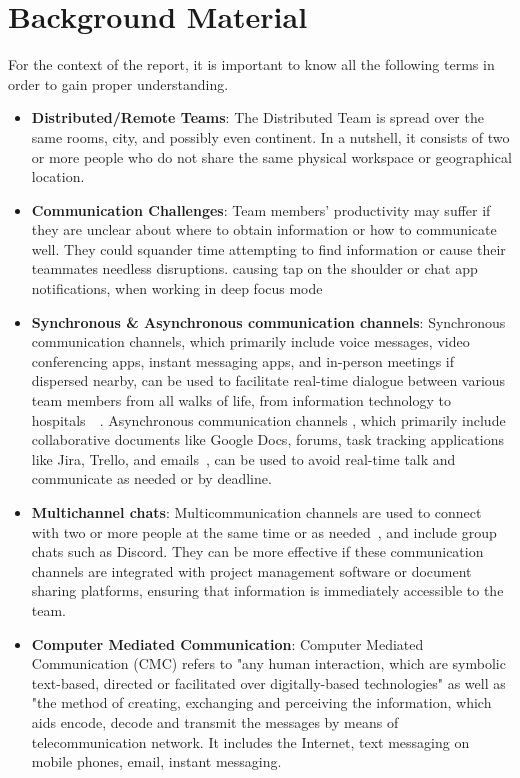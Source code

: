 \documentclass{llncs}
\begin{document}
\section{Background Material}
For the context of the report, it is important to know all the following terms in order to gain proper understanding.

 \begin{itemize}
    \item \textbf{Distributed/Remote Teams}: The Distributed Team is spread over the same rooms, city, and possibly even continent. In a nutshell, it consists of two or more people who do not share the same physical workspace or geographical location.~\cite{refbook1}\\
    \item \textbf{Communication Challenges}: Team members' productivity may suffer if they are unclear about where to obtain information or how to communicate well. They could squander time attempting to find information or cause their teammates needless disruptions. causing tap on the shoulder or chat app notifications, when working in deep focus mode ~\cite{refbook1}\\
    \item \textbf{Synchronous \& Asynchronous communication channels}: 
    Synchronous communication channels, which primarily include voice messages, video conferencing apps, instant messaging apps, and in-person meetings if dispersed nearby, can be used to facilitate real-time dialogue between various team members from all walks of life, from information technology to hospitals~\cite{refbook1}~\cite{refpaper1}.
    Asynchronous communication channels , which primarily include collaborative documents like Google Docs, forums, task tracking applications like Jira, Trello, and emails~\cite{refpaper2}, can be used to avoid real-time talk and communicate as needed or by deadline.~\cite{refbook1} \\
    \item \textbf{Multichannel chats}: Multicommunication channels are used to connect with two or more people at the same time or as needed~\cite{refpaper2}, and include group chats such as Discord. They can be more effective if these communication channels are integrated with project management software or document sharing platforms, ensuring that information is immediately accessible to the team.~\cite{refpaper4}\\
    \item \textbf{Computer Mediated Communication}:  Computer Mediated Communication (CMC) refers to "any human interaction, which are symbolic text-based, directed or facilitated over digitally-based technologies" as well as "the method of creating, exchanging and perceiving the information, which aids encode, decode and transmit the messages by means of telecommunication network. It includes the Internet, text messaging on mobile phones, email, instant messaging.~\cite{refpaper5}
\end{itemize}
\end{document}
